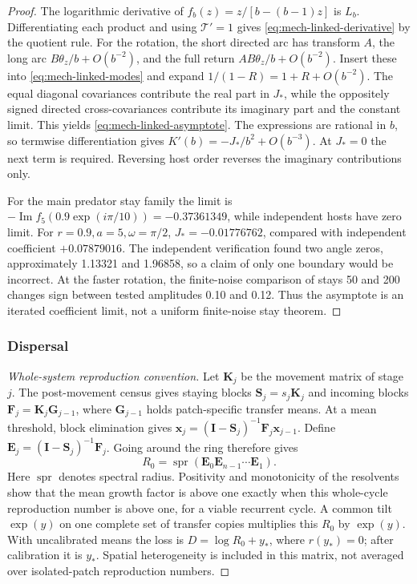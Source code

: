\begin{proof}
The logarithmic derivative of \(f_b(z)=z/[b-(b-1)z]\) is \(L_b\). Differentiating each product and using \(\mathcal T'=1\) gives \eqref{eq:mech-linked-derivative} by the quotient rule. For the rotation, the short directed arc has transform \(A\), the long arc \(B\theta_z/b+O(b^{-2})\), and the full return \(AB\theta_z/b+O(b^{-2})\). Insert these into \eqref{eq:mech-linked-modes} and expand \(1/(1-R)=1+R+O(b^{-2})\). The equal diagonal covariances contribute the real part in \(J_*\), while the oppositely signed directed cross-covariances contribute its imaginary part and the constant limit. This yields \eqref{eq:mech-linked-asymptote}. The expressions are rational in \(b\), so termwise differentiation gives \(K'(b)=-J_*/b^2+O(b^{-3})\). At \(J_*=0\) the next term is required. Reversing host order reverses the imaginary contributions only.

For the main predator stay family the limit is \(-\operatorname{Im}f_5(0.9\exp(i\pi/10))=-0.37361349\), while independent hosts have zero limit. For \(r=0.9,a=5,\omega=\pi/2\), \(J_*=-0.01776762\), compared with independent coefficient \(+0.07879016\). The independent verification found two angle zeros, approximately 1.13321 and 1.96858, so a claim of only one boundary would be incorrect. At the faster rotation, the finite-noise comparison of stays 50 and 200 changes sign between tested amplitudes 0.10 and 0.12. Thus the asymptote is an iterated coefficient limit, not a uniform finite-noise stay theorem.
\end{proof}

\subsubsection{Dispersal}\label{app:mech-spatial}
\begin{proof}[Whole-system reproduction convention]
Let \(\mathbf K_j\) be the movement matrix of stage \(j\). The post-movement census gives staying blocks \(\mathbf S_j=s_j\mathbf K_j\) and incoming blocks \(\mathbf F_j=\mathbf K_j\mathbf G_{j-1}\), where \(\mathbf G_{j-1}\) holds patch-specific transfer means. At a mean threshold, block elimination gives
\(\mathbf x_j=(\mathbf I-\mathbf S_j)^{-1}\mathbf F_j\mathbf x_{j-1}\).
Define \(\mathbf E_j=(\mathbf I-\mathbf S_j)^{-1}\mathbf F_j\). Going around the ring therefore gives
\[
 R_0=\operatorname{spr}(\mathbf E_0\mathbf E_{n-1}\cdots\mathbf E_1).
\]
Here \(\operatorname{spr}\) denotes spectral radius. Positivity and monotonicity of the resolvents show that the mean growth factor is above one exactly when this whole-cycle reproduction number is above one, for a viable recurrent cycle. A common tilt \(\exp(y)\) on one complete set of transfer copies multiplies this \(R_0\) by \(\exp(y)\). With uncalibrated means the loss is \(D=\log R_0+y_*\), where \(r(y_*)=0\); after calibration it is \(y_*\). Spatial heterogeneity is included in this matrix, not averaged over isolated-patch reproduction numbers.
\end{proof}

